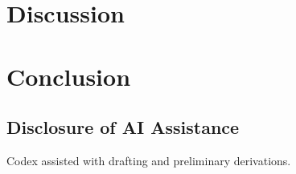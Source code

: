 \section{Discussion}
\label{sec:discussion}


\section{Conclusion}
\label{sec:conclusion}


\subsection*{Disclosure of AI Assistance}
\label{subsec:ai_disclosure}

\noindent Codex assisted with drafting and preliminary derivations.